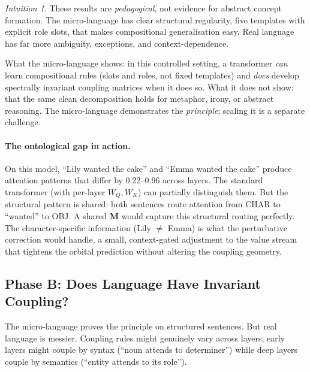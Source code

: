 \documentclass[11pt, a4paper]{article}
\newcommand{\M}{\mathbf{M}}
\theoremstyle{remark}
\newtheorem*{intuition}{Intuition}
\begin{document}
\begin{intuition}
These results are \emph{pedagogical}, not evidence for abstract concept formation.
The micro-language has clear structural regularity, five templates with explicit role slots, that makes compositional generalisation easy.
Real language has far more ambiguity, exceptions, and context-dependence.

What the micro-language shows: in this controlled setting, a transformer \emph{can} learn compositional rules (slots and roles, not fixed templates) and \emph{does} develop spectrally invariant coupling matrices when it does so.
What it does not show: that the same clean decomposition holds for metaphor, irony, or abstract reasoning.
The micro-language demonstrates the \emph{principle}; scaling it is a separate challenge.
\end{intuition}

\paragraph{The ontological gap in action.}
On this model, ``Lily wanted the cake'' and ``Emma wanted the cake'' produce attention patterns that differ by 0.22--0.96 across layers.
The standard transformer (with per-layer $W_Q, W_K$) can partially distinguish them.
But the structural pattern is shared: both sentences route attention from CHAR to ``wanted'' to OBJ.
A shared $\M$ would capture this structural routing perfectly.
The character-specific information (Lily $\neq$ Emma) is what the perturbative correction would handle, a small, context-gated adjustment to the value stream that tightens the orbital prediction without altering the coupling geometry.



\subsection{Phase B: Does Language Have Invariant Coupling?}
\label{sec:grn:phase-b}

The micro-language proves the principle on structured sentences.
But real language is messier.
Coupling rules might genuinely vary across layers, early layers might couple by syntax (``noun attends to determiner'') while deep layers couple by semantics (``entity attends to its role'').
\end{document}
